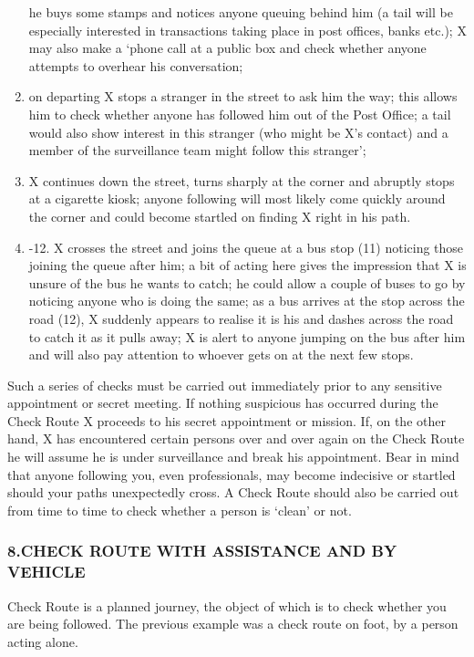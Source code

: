 \begin{enumerate}
  he buys some stamps and notices anyone queuing behind him (a tail will
  be especially interested in transactions taking place in post offices,
  banks etc.); X may also make a `phone call at a public box and check
  whether anyone attempts to overhear his conversation;
\item
  on departing X stops a stranger in the street to ask him the way; this
  allows him to check whether anyone has followed him out of the Post
  Office; a tail would also show interest in this stranger (who might be
  X's contact) and a member of the surveillance team might follow this
  stranger';
\item
  X continues down the street, turns sharply at the corner and abruptly
  stops at a cigarette kiosk; anyone following will most likely come
  quickly around the corner and could become startled on finding X right
  in his path.
\item
  -12. X crosses the street and joins the queue at a bus stop (11)
  noticing those joining the queue after him; a bit of acting here gives
  the impression that X is unsure of the bus he wants to catch; he could
  allow a couple of buses to go by noticing anyone who is doing the
  same; as a bus arrives at the stop across the road (12), X suddenly
  appears to realise it is his and dashes across the road to catch it as
  it pulls away; X is alert to anyone jumping on the bus after him and
  will also pay attention to whoever gets on at the next few stops.
\end{enumerate}

Such a series of checks must be carried out immediately prior to any
sensitive appointment or secret meeting. If nothing suspicious has
occurred during the Check Route X proceeds to his secret appointment or
mission. If, on the other hand, X has encountered certain persons over
and over again on the Check Route he will assume he is under
surveillance and break his appointment. Bear in mind that anyone
following you, even professionals, may become indecisive or startled
should your paths unexpectedly cross. A Check Route should also be
carried out from time to time to check whether a person is `clean' or
not.

\subsubsection{8.CHECK ROUTE WITH ASSISTANCE AND BY VEHICLE}

Check Route is a planned journey, the object of which is to check
whether you are being followed. The previous example was a check route
on foot, by a person acting alone.

